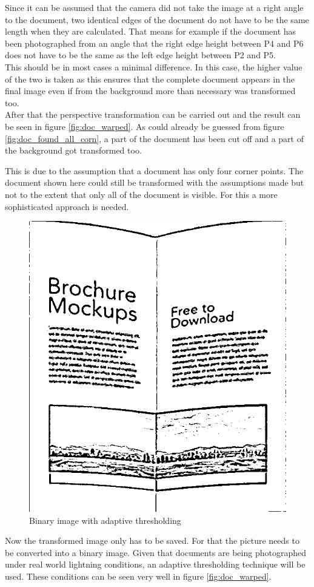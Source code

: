 Since it can be assumed that the camera did not take the image at a right angle to the document, two identical edges of the document do not have to be the same length when they are calculated. That means for example if the document has been photographed from an angle that the right edge height between P4 and P6 does not have to be the same as the left edge height between P2 and P5.\\

This should be in most cases a minimal difference. In this case, the higher value of the two is taken as this ensures that the complete document appears in the final image even if from the background more than necessary was transformed too.\\

After that the perspective transformation can be carried out and the result can be seen in figure \ref{fig:doc_warped}. As could already be guessed from figure \ref{fig:doc_found_all_corn}, a part of the document has been cut off and a part of the background got transformed too. \\
 
\newpage
 
This is due to the assumption that a document has only four corner points. The document shown here could still be transformed with the assumptions made but not to the extent that only all of the document is visible. For this a more sophisticated approach is needed.\\ 

\begin{figure}
    \centering
    \captionsetup{justification=centering}
    \includegraphics[width=.4\textwidth]{images/3_folded_doc/result.jpg}
    \caption{Binary image with adaptive thresholding}
    \label{fig:doc_binary}
    \vspace{-2mm}
\end{figure}


Now the transformed image only has to be saved. For that the picture needs to be converted into a binary image. Given that documents are being photographed under real world lightning conditions, an adaptive thresholding technique will be used. \cite{threshold} These conditions can be seen very well in figure \ref{fig:doc_warped}.\\

